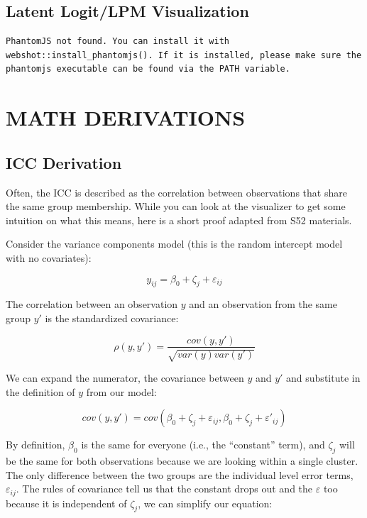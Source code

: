 \documentclass[
  letterpaper,
  DIV=11,
  numbers=noendperiod]{scrreprt}
\begin{document}
\hypertarget{latent-logitlpm-visualization}{%
\chapter{Latent Logit/LPM
Visualization}\label{latent-logitlpm-visualization}}

\begin{verbatim}
PhantomJS not found. You can install it with webshot::install_phantomjs(). If it is installed, please make sure the phantomjs executable can be found via the PATH variable.
\end{verbatim}

\part{MATH DERIVATIONS}

\hypertarget{icc-derivation}{%
\chapter{ICC Derivation}\label{icc-derivation}}

Often, the ICC is described as the correlation between observations that
share the same group membership. While you can look at the visualizer to
get some intuition on what this means, here is a short proof adapted
from S52 materials.

Consider the variance components model (this is the random intercept
model with no covariates):

\[
y_{ij} = \beta_0 + \zeta_j + \varepsilon_{ij}
\]

The correlation between an observation \(y\) and an observation from the
same group \(y'\) is the standardized covariance:

\[
\rho(y, y') = \frac{cov(y,y')}{\sqrt{var(y)var(y')}}
\]

We can expand the numerator, the covariance between \(y\) and \(y'\) and
substitute in the definition of \(y\) from our model:

\[
cov(y,y') = cov(\beta_0 + \zeta_j + \varepsilon_{ij}, \beta_0 + \zeta_j + \varepsilon'_{ij})
\]

By definition, \(\beta_0\) is the same for everyone (i.e., the
``constant'' term), and \(\zeta_j\) will be the same for both
observations because we are looking within a single cluster. The only
difference between the two groups are the individual level error terms,
\(\varepsilon_{ij}\). The rules of covariance tell us that the constant
drops out and the \(\varepsilon\) too because it is independent of
\(\zeta_j\), we can simplify our equation:
\end{document}
